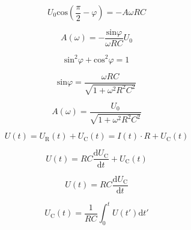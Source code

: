     \begin{equation}
        U_0 \text{cos}(\frac{\pi}{2} - \varphi) = -A \omega R C 
    \end{equation}

    \begin{equation}
        A(\omega) = - \frac{\text{sin} \varphi}{\omega R C} U_0
    \end{equation}

    \begin{equation}
        \text{sin}^2 \varphi + \text{cos}^2 \varphi = 1
    \end{equation}

    \begin{equation}
        \text{sin} \varphi = \frac{\omega R C}{ \sqrt{1 + \omega^2 R^2 C^2} }
    \end{equation}

    \begin{equation}
        A(\omega) = \frac{U_0}{\sqrt{1 + \omega^2 R^2 C^2}}
    \end{equation}

    \begin{equation}
        U(t) = U_{\text{R}}(t) + U_{\text{C}}(t) = I(t) \cdot R + U_{\text{C}}(t)
    \end{equation}

    \begin{equation}
        U(t) = RC \frac{\text{d}U_{\text{C}}}{\text{d}t} + U_{\text{C}}(t)
    \end{equation}

    \begin{equation}
        U(t) = RC \frac{\text{d}U_{\text{C}}}{\text{d}t}
    \end{equation}

    \begin{equation}
        U_{\text{C}}(t) = \frac{1}{RC} \int_0^t U(t')\text{d}t'
    \end{equation}
